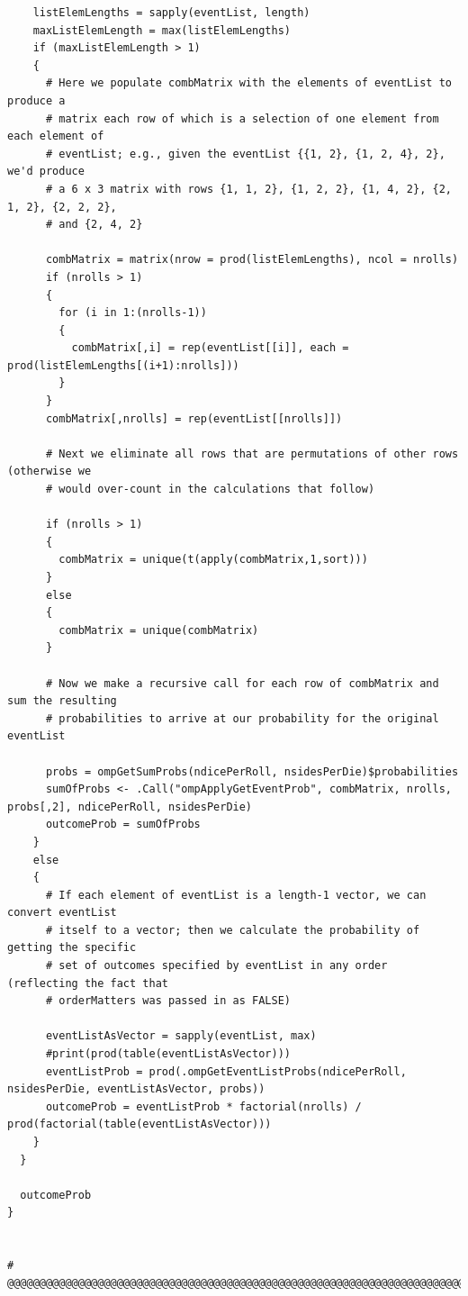 \documentclass[12pt]{article}
\begin{document}
\begin{lstlisting}
    listElemLengths = sapply(eventList, length)
    maxListElemLength = max(listElemLengths)
    if (maxListElemLength > 1)
    {
      # Here we populate combMatrix with the elements of eventList to produce a 
      # matrix each row of which is a selection of one element from each element of
      # eventList; e.g., given the eventList {{1, 2}, {1, 2, 4}, 2}, we'd produce
      # a 6 x 3 matrix with rows {1, 1, 2}, {1, 2, 2}, {1, 4, 2}, {2, 1, 2}, {2, 2, 2},
      # and {2, 4, 2}
      
      combMatrix = matrix(nrow = prod(listElemLengths), ncol = nrolls)
      if (nrolls > 1)
      {
        for (i in 1:(nrolls-1))
        {
          combMatrix[,i] = rep(eventList[[i]], each = prod(listElemLengths[(i+1):nrolls]))
        }
      }
      combMatrix[,nrolls] = rep(eventList[[nrolls]])
      
      # Next we eliminate all rows that are permutations of other rows (otherwise we
      # would over-count in the calculations that follow)
      
      if (nrolls > 1)
      {
        combMatrix = unique(t(apply(combMatrix,1,sort)))
      }
      else
      {
        combMatrix = unique(combMatrix)
      }
      
      # Now we make a recursive call for each row of combMatrix and sum the resulting
      # probabilities to arrive at our probability for the original eventList
      
      probs = ompGetSumProbs(ndicePerRoll, nsidesPerDie)$probabilities
      sumOfProbs <- .Call("ompApplyGetEventProb", combMatrix, nrolls, probs[,2], ndicePerRoll, nsidesPerDie)
      outcomeProb = sumOfProbs
    }
    else
    {
      # If each element of eventList is a length-1 vector, we can convert eventList
      # itself to a vector; then we calculate the probability of getting the specific
      # set of outcomes specified by eventList in any order (reflecting the fact that 
      # orderMatters was passed in as FALSE)
      
      eventListAsVector = sapply(eventList, max)
      #print(prod(table(eventListAsVector)))
      eventListProb = prod(.ompGetEventListProbs(ndicePerRoll, nsidesPerDie, eventListAsVector, probs))
      outcomeProb = eventListProb * factorial(nrolls) / prod(factorial(table(eventListAsVector)))
    }
  }
  
  outcomeProb
}


# @@@@@@@@@@@@@@@@@@@@@@@@@@@@@@@@@@@@@@@@@@@@@@@@@@@@@@@@@@@@@@@@@@@@@@@@@@@@@@@@@@@@



\end{lstlisting}
\end{document}

